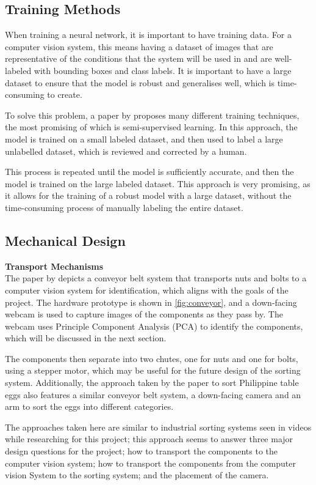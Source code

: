 \subsection{Training Methods}
When training a neural network, it is important to have training data. For a computer vision system, this means having a dataset of images that are representative of the conditions that the system will be used in and
are well-labeled with bounding boxes and class labels. It is important to have a large dataset to ensure that the model is robust and generalises well, which is time-consuming to create.

To solve this problem, a paper by \citet{Yang_2023} proposes many different training techniques, the most promising of which is semi-supervised learning. In this approach, the model is trained on a small labeled dataset, and then
used to label a large unlabelled dataset, which is reviewed and corrected by a human.

This process is repeated until the model is sufficiently accurate, and then the model is trained on the large labeled dataset. This approach
is very promising, as it allows for the training of a robust model with a large dataset, without the time-consuming process of manually labeling the entire dataset.

\subsection{Mechanical Design}

\noindent
\textbf{Transport Mechanisms} \\
The paper by \citet{Dhenge2013MechanicalNS} depicts a conveyor belt system that transports nuts and bolts to a computer vision system for identification, which aligns with the goals of the project. 
The hardware prototype is shown in \autoref{fig:conveyor}, and a down-facing webcam is used to capture images of the components as they pass by. The webcam uses Principle Component Analysis (PCA) to identify the components,
which will be discussed in the next section.

The components then separate into two chutes, one for nuts and one for bolts, using a stepper motor, which may be useful for the future design of the sorting system.
Additionally, the approach taken by the paper \citet{eggsorting} to sort Philippine table eggs also features a similar conveyor belt system, a down-facing camera and an arm to sort the eggs into different categories. 

The approaches taken here are similar to industrial sorting systems seen in videos while researching for this project; this approach seems to answer three major design questions for the project;
how to transport the components to the computer vision system; how to transport the components from the computer vision System to the sorting system; and the placement of the camera.

